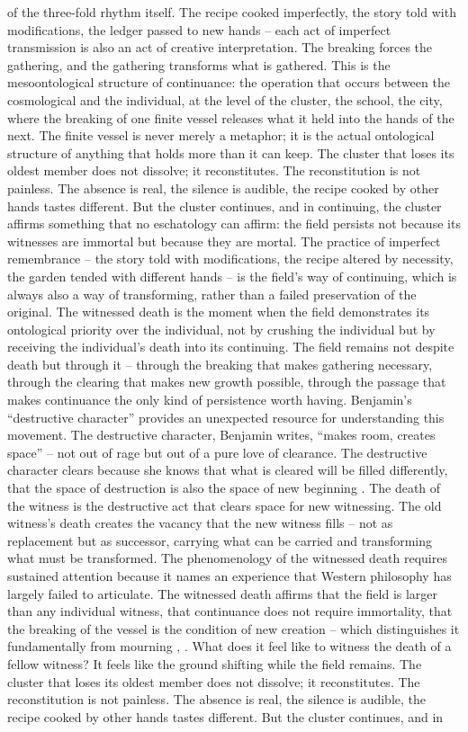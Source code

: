 of the three-fold rhythm itself. The recipe cooked imperfectly, the story told with modifications, the ledger passed to new hands – each act of imperfect transmission is also an act of creative interpretation. The breaking forces the gathering, and the gathering transforms what is gathered. This is the mesoontological structure of continuance: the operation that occurs between the cosmological and the individual, at the level of the cluster, the school, the city, where the breaking of one finite vessel releases what it held into the hands of the next. The finite vessel is never merely a metaphor; it is the actual ontological structure of anything that holds more than it can keep. The cluster that loses its oldest member does not dissolve; it reconstitutes. The reconstitution is not painless. The absence is real, the silence is audible, the recipe cooked by other hands tastes different. But the cluster continues, and in continuing, the cluster affirms something that no eschatology can affirm: the field persists not because its witnesses are immortal but because they are mortal. The practice of imperfect remembrance – the story told with modifications, the recipe altered by necessity, the garden tended with different hands – is the field’s way of continuing, which is always also a way of transforming, rather than a failed preservation of the original. The witnessed death is the moment when the field demonstrates its ontological priority over the individual, not by crushing the individual but by receiving the individual’s death into its continuing. The field remains not despite death but through it – through the breaking that makes gathering necessary, through the clearing that makes new growth possible, through the passage that makes continuance the only kind of persistence worth having. Benjamin’s “destructive character” provides an unexpected resource for understanding this movement. The destructive character, Benjamin writes, “makes room, creates space” – not out of rage but out of a pure love of clearance. The destructive character clears because she knows that what is cleared will be filled differently, that the space of destruction is also the space of new beginning \cite{benjamin_1931}. The death of the witness is the destructive act that clears space for new witnessing. The old witness’s death creates the vacancy that the new witness fills – not as replacement but as successor, carrying what can be carried and transforming what must be transformed. The phenomenology of the witnessed death requires sustained attention because it names an experience that Western philosophy has largely failed to articulate. The witnessed death affirms that the field is larger than any individual witness, that continuance does not require immortality, that the breaking of the vessel is the condition of new creation – which distinguishes it fundamentally from mourning \cite{freud_1917}, \cite[pp.~9-10, 139-142]{derrida_1993}. What does it feel like to witness the death of a fellow witness? It feels like the ground shifting while the field remains. The cluster that loses its oldest member does not dissolve; it reconstitutes. The reconstitution is not painless. The absence is real, the silence is audible, the recipe cooked by other hands tastes different. But the cluster continues, and in 